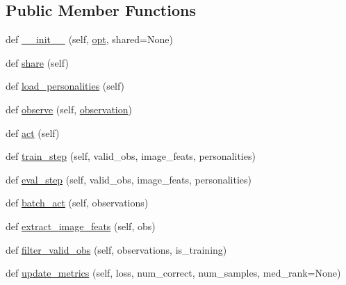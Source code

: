 \subsection*{Public Member Functions}
\begin{DoxyCompactItemize}
\item 
def \hyperlink{classtransresnet_1_1transresnet_1_1TransresnetAgent_a870c5ec03eb32691de40d3b0af17626e}{\+\_\+\+\_\+init\+\_\+\+\_\+} (self, \hyperlink{classtransresnet_1_1transresnet_1_1TransresnetAgent_ae8876e2ef775276466938ae79798bc43}{opt}, shared=None)
\item 
def \hyperlink{classtransresnet_1_1transresnet_1_1TransresnetAgent_a1a1e5d359d0c7dadfb6eb67a5db686b5}{share} (self)
\item 
def \hyperlink{classtransresnet_1_1transresnet_1_1TransresnetAgent_a7942a8dde793c66e0280c1b2c88be32a}{load\+\_\+personalities} (self)
\item 
def \hyperlink{classtransresnet_1_1transresnet_1_1TransresnetAgent_a6490d77774f8b371ceba5546556e907b}{observe} (self, \hyperlink{classtransresnet_1_1transresnet_1_1TransresnetAgent_a468ba9e599d6b6f51261729974763b82}{observation})
\item 
def \hyperlink{classtransresnet_1_1transresnet_1_1TransresnetAgent_ad59fea461b2ea1f9731742901203bdd7}{act} (self)
\item 
def \hyperlink{classtransresnet_1_1transresnet_1_1TransresnetAgent_a6e576f371b589734c69998b75b72577c}{train\+\_\+step} (self, valid\+\_\+obs, image\+\_\+feats, personalities)
\item 
def \hyperlink{classtransresnet_1_1transresnet_1_1TransresnetAgent_aa5c56c53ab470893e92e0c35a5a802c7}{eval\+\_\+step} (self, valid\+\_\+obs, image\+\_\+feats, personalities)
\item 
def \hyperlink{classtransresnet_1_1transresnet_1_1TransresnetAgent_a5eadf6ccc4b1d15a520a70d111bff493}{batch\+\_\+act} (self, observations)
\item 
def \hyperlink{classtransresnet_1_1transresnet_1_1TransresnetAgent_a065c38b276b601ca97584fa4b9a76006}{extract\+\_\+image\+\_\+feats} (self, obs)
\item 
def \hyperlink{classtransresnet_1_1transresnet_1_1TransresnetAgent_a96ebfee0a6b2acf1c1d1696befd397e3}{filter\+\_\+valid\+\_\+obs} (self, observations, is\+\_\+training)
\item 
def \hyperlink{classtransresnet_1_1transresnet_1_1TransresnetAgent_ae061df235655fbf253702a21b0461755}{update\+\_\+metrics} (self, loss, num\+\_\+correct, num\+\_\+samples, med\+\_\+rank=None)

\end{DoxyCompactItemize}
